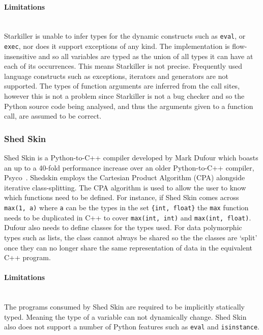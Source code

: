 \documentclass[12pt, titlepage]{article}
\begin{document}
\paragraph*{Limitations}\mbox{}\\
Starkiller is unable to infer types for the dynamic constructs such as \texttt{eval}, or \texttt{exec}, nor does it support exceptions of any kind. The implementation is flow-insensitive and so all variables are typed as the union of all types it can have at each of its occurrences. This means Starkiller is not precise. Frequently used language constructs such as exceptions, iterators and generators are not supported. The types of function arguments are inferred from the call sites, however this is not a problem since Starkiller is not a bug checker and so the Python source code being analysed, and thus the arguments given to a function call, are assumed to be correct.

\subsubsection{Shed Skin}
Shed Skin is a Python-to-C++ compiler developed by Mark Dufour which boasts an up to a 40-fold performance increase over an older Python-to-C++ compiler, Psyco~\cite{shedskin}. Shedskin employs the Cartesian Product Algorithm (CPA) alongside iterative class-splitting. The CPA algorithm is used to allow the user to know which functions need to be defined. For instance, if Shed Skin comes across \texttt{max(1, a)} where \texttt{a} can be the types in the set \texttt{\{int, float\}} the \texttt{max} function needs to be duplicated in C++ to cover \texttt{max(int, int)} and \texttt{max(int, float)}. Dufour also needs to define classes for the types used. For data polymorphic types such as lists, the class cannot always be shared so the the classes are `split' once they can no longer share the same representation of data in the equivalent C++ program.

\paragraph*{Limitations}\mbox{}\\
The programs consumed by Shed Skin are required to be implicitly statically typed. Meaning the type of a variable can not dynamically change. Shed Skin also does not support a number of Python features such as \texttt{eval} and \texttt{isinstance}.
\end{document}
